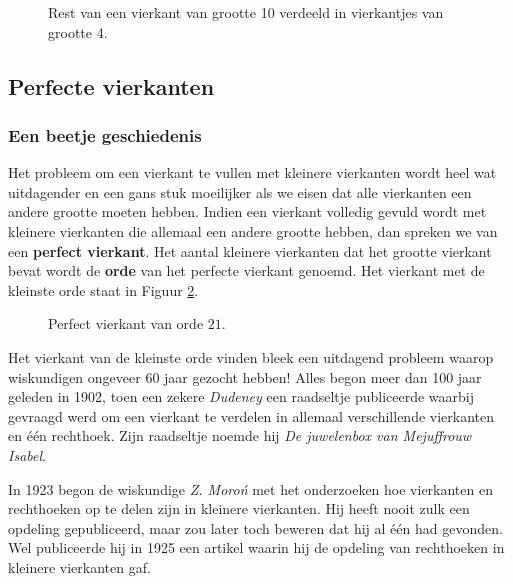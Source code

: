 

\begin{figure}[ht]
  \centering
  
  \caption{Rest van een vierkant van grootte 10 verdeeld in vierkantjes van grootte 4.}
  \label{fig:vierkant10_4x4}
\end{figure}

\newpage
\subsection{Perfecte vierkanten}

\subsubsection{Een beetje geschiedenis}

Het probleem om een vierkant te vullen met kleinere vierkanten wordt heel wat uitdagender en een gans stuk moeilijker als we eisen dat alle vierkanten een andere grootte moeten hebben. Indien een vierkant volledig gevuld wordt met kleinere vierkanten die allemaal een andere grootte hebben, dan spreken we van een {\bf perfect vierkant}. Het aantal kleinere vierkanten dat het grootte vierkant bevat wordt de {\bf orde} van het perfecte vierkant genoemd. Het vierkant met de kleinste orde staat in Figuur \ref{fig:pv21}.

\begin{figure}[ht]
  \centering
  
  \caption{Perfect vierkant van orde $21$.}
  \label{fig:pv21}
\end{figure}

Het vierkant van de kleinste orde vinden bleek een uitdagend probleem waarop wiskundigen ongeveer 60 jaar gezocht hebben! Alles begon meer dan 100 jaar geleden in 1902, toen een zekere {\it Dudeney} een raadseltje publiceerde waarbij gevraagd werd om een vierkant te verdelen in allemaal verschillende vierkanten en \'e\'en rechthoek. Zijn raadseltje noemde hij {\it De juwelenbox van Mejuffrouw Isabel}.

In 1923 begon de wiskundige {\it Z. Moro\'n} met het onderzoeken hoe vierkanten en rechthoeken op te delen zijn in kleinere vierkanten. Hij heeft nooit zulk een opdeling gepubliceerd, maar zou later toch beweren dat hij al \'e\'en had gevonden. Wel publiceerde hij in 1925 een artikel waarin hij de opdeling van rechthoeken in kleinere vierkanten gaf.

